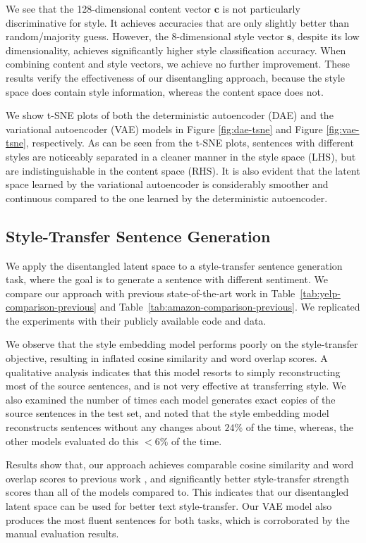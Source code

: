 \documentclass[letterpaper]{article} %
\begin{document}
We see that the 128-dimensional content vector $\bm c$ is not particularly discriminative for style.
It achieves accuracies that are only slightly better than random/majority guess.
However, the 8-dimensional style vector $\bm s$, despite its low dimensionality, achieves significantly higher style classification accuracy.
When combining content and style vectors, we achieve no further improvement.
These results verify the effectiveness of our disentangling approach, because the style space does contain style information, whereas the content space does not.

We show t-SNE plots of both the deterministic autoencoder (DAE) and the variational autoencoder (VAE) models in Figure \ref{fig:dae-tsne} and Figure \ref{fig:vae-tsne}, respectively.
As can be seen from the t-SNE plots, sentences with different styles are noticeably separated in a cleaner manner in the style space (LHS), but are indistinguishable in the content space (RHS).
It is also evident that the latent space learned by the variational autoencoder is considerably smoother and continuous compared to the one learned by the deterministic autoencoder.


\subsection{Style-Transfer Sentence Generation}

We apply the disentangled latent space to a style-transfer sentence generation task, where the goal is to generate a sentence with different sentiment.
We compare our approach with previous state-of-the-art work in Table~\ref{tab:yelp-comparison-previous} and Table~\ref{tab:amazon-comparison-previous}.
We replicated the experiments with their publicly available code and data.

We observe that the style embedding model \cite{fu2018style} performs poorly on the style-transfer objective, resulting in inflated cosine similarity and word overlap scores.
A qualitative analysis indicates that this model resorts to simply reconstructing most of the source sentences, and is not very effective at transferring style.
We also examined the number of times each model generates exact copies of the source sentences in the test set, and noted that the style embedding model reconstructs sentences without any changes about $24\%$ of the time, whereas, the other models evaluated do this $<6\%$ of the time.

Results show that, our approach achieves comparable cosine similarity and word overlap scores to previous work \cite{shen2017style,zhao2018adversarially}, and significantly better style-transfer strength scores than all of the models compared to. This indicates that our disentangled latent space can be used for better text style-transfer.
Our VAE model also produces the most fluent sentences for both tasks, which is corroborated by the manual evaluation results.
\end{document}
